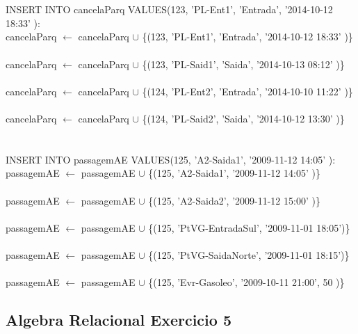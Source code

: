 \documentclass[a4paper]{article}
\begin{document}
\\
\\
INSERT INTO cancelaParq VALUES(123, 'PL-Ent1', 'Entrada', '2014-10-12 18:33' ):\\
cancelaParq $\leftarrow$ cancelaParq $\cup$ \{(123, 'PL-Ent1', 'Entrada', '2014-10-12 18:33' )\}\\
\\
cancelaParq $\leftarrow$ cancelaParq $\cup$ \{(123, 'PL-Said1', 'Saida', '2014-10-13 08:12' )\}\\
\\
cancelaParq $\leftarrow$ cancelaParq $\cup$ \{(124, 'PL-Ent2', 'Entrada', '2014-10-10 11:22' )\}\\
\\
cancelaParq $\leftarrow$ cancelaParq $\cup$ \{(124, 'PL-Said2', 'Saida', '2014-10-12 13:30' )\}\\
\\
\\
\newpage
\noindent INSERT INTO passagemAE VALUES(125, 'A2-Saida1', '2009-11-12 14:05' ):\\
passagemAE $\leftarrow$ passagemAE $\cup$ \{(125, 'A2-Saida1', '2009-11-12 14:05' )\}\\
\\
passagemAE $\leftarrow$ passagemAE $\cup$ \{(125, 'A2-Saida2', '2009-11-12 15:00' )\}\\
\\
passagemAE $\leftarrow$ passagemAE $\cup$ \{(125, 'PtVG-EntradaSul', '2009-11-01 18:05')\}\\
\\
passagemAE $\leftarrow$ passagemAE $\cup$ \{(125, 'PtVG-SaidaNorte', '2009-11-01 18:15')\}\\
\\
passagemAE $\leftarrow$ passagemAE $\cup$ \{(125, 'Evr-Gasoleo', '2009-10-11 21:00', 50 )\}\\

\newpage
\subsection{Algebra Relacional Exercicio 5}
\end{document}
